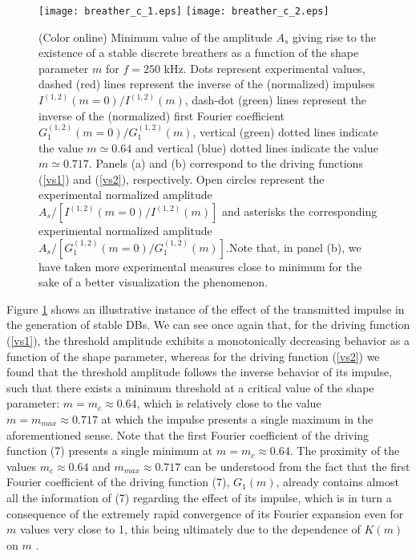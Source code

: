 \documentclass[showpacs,preprintnumbers,10pt,onecolumn]{revtex4}%
\begin{document}
\begin{figure}[h]
\texttt{[image: breather\_c\_1.eps]}
\texttt{[image: breather\_c\_2.eps]}
\caption{(Color online) Minimum value of the amplitude $A_{s}$ giving rise to the existence of a stable discrete
breathers as a function of the shape parameter $m$ for $f=250$ kHz. Dots represent experimental values, 
dashed (red) lines
represent the inverse of the (normalized) impulses $I^{(1,2)}(m=0)/I^{(1,2)}(m)$, dash-dot (green) lines represent
the inverse of the (normalized) first Fourier coefficient $G^{(1,2)}_1(m=0)/G^{(1,2)}_1(m)$, vertical (green) dotted lines indicate the value $m\simeq0.64$
and vertical (blue) dotted lines indicate the value $m\simeq0.717$.  Panels (a) and (b) correspond to the driving 
functions (\ref{vs1}) and (\ref{vs2}), respectively. Open circles represent the experimental normalized amplitude $A_{s}/[I^{(1,2)}(m=0)/I^{(1,2)}(m)]$ and 
asterisks the corresponding experimental normalized amplitude $A_{s}/[G^{(1,2)}_1(m=0)/G^{(1,2)}_1(m)]$.Note that, in panel (b), we have taken more experimental
measures close to minimum for the sake of a better visualization the phenomenon. }%
\label{breather_c}%
\end{figure}

Figure \ref{breather_c} shows an illustrative instance
of the effect of the transmitted impulse in the generation of stable DBs. We
can see once again that, for the driving function (\ref{vs1}), the
threshold amplitude exhibits a monotonically decreasing behavior as a function
of the shape parameter, whereas for the driving function (\ref{vs2}) we found
that the threshold amplitude follows the inverse behavior of its impulse, such
that there exists a minimum threshold at a critical value of the shape
parameter: $m=m_{c}\approx0.64$, which is relatively close to the value
$m=m_{max}\approx0.717$ at which the impulse presents a single maximum in the
aforementioned sense. Note that the first Fourier coefficient of the driving
function (7) presents a single minimum at $m=m_{c}\approx0.64$. The proximity
of the values $m_{c}\approx0.64$ and $m_{max}\approx0.717$ can be understood
from the fact that the first Fourier coefficient of the driving function (7),
$G_{1}(m)$, already contains almost all the information of (7) regarding the
effect of its impulse, which is in turn a consequence of the extremely rapid
convergence of its Fourier expansion even for $m$ values very close to 1,
this being ultimately due to the dependence of $K(m)$ on $m$ \cite{17}.
\end{document}
